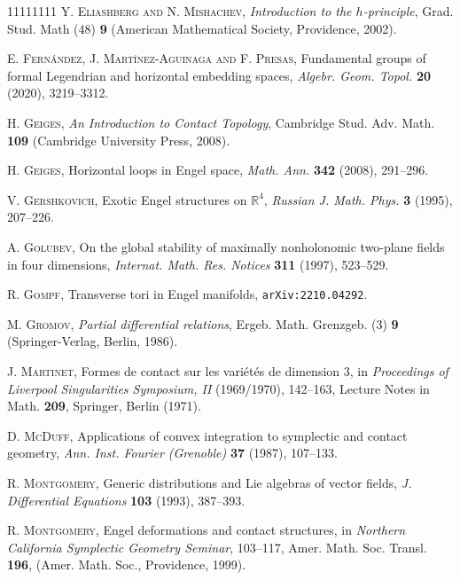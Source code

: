 \documentclass{amsart} %
\newcommand{\R}{\mathbb{R}}
\theoremstyle{thm}
\theoremstyle{definition}
\begin{document}
\begin{thebibliography} {11111111}
 \textsc{Y. Eliashberg and N. Mishachev}, \textit{Introduction to the $h$-principle}, Grad. Stud. Math (48) \textbf{9}  (American Mathematical Society, Providence, 2002).

 \textsc{E. Fern\'{a}ndez, J. Mart\'{i}nez-Aguinaga and F. Presas}, Fundamental groups of formal Legendrian and horizontal embedding spaces, \textit{Algebr. Geom. Topol.} \textbf{20} (2020), 3219--3312.

 \textsc{H. Geiges}, \textit{An Introduction to Contact Topology}, Cambridge Stud. Adv. Math. \textbf{109}  (Cambridge University Press, 2008).

 \textsc{H. Geiges}, Horizontal loops in Engel space, \textit{Math. Ann.} \textbf{342} (2008), 291--296.

 \textsc{V. Gershkovich}, Exotic Engel structures on $\R^4$, \textit{Russian J. Math. Phys.} \textbf{3} (1995), 207--226.

 \textsc{A. Golubev}, On the global stability of maximally nonholonomic two-plane fields in four dimensions, \textit{Internat. Math. Res. Notices} \textbf{311} (1997), 523--529.

 \textsc{R. Gompf}, Transverse tori in Engel manifolds, \texttt{arXiv:2210.04292}. 

 \textsc{M. Gromov}, \textit{Partial differential relations}, Ergeb. Math. Grenzgeb. (3) \textbf{9}  (Springer-Verlag, Berlin, 1986).


 \textsc{J. Martinet}, Formes de contact sur les vari\'et\'es de dimension $3$, in \textit{Proceedings of Liverpool Singularities Symposium, II} (1969/1970), 142--163, Lecture Notes in Math. \textbf{209}, Springer, Berlin (1971).

 \textsc{D. McDuff}, Applications of convex integration to symplectic and contact geometry, \textit{Ann. Inst. Fourier (Grenoble)} \textbf{37} (1987), 107--133.

 \textsc{R. Montgomery}, Generic distributions and Lie algebras of vector fields, \textit{J. Differential Equations} \textbf{103} (1993), 387--393.

 \textsc{R. Montgomery}, Engel deformations and contact structures, in \textit{Northern {C}alifornia {S}ymplectic {G}eometry {S}eminar}, 103--117, Amer. Math. Soc. Transl. \textbf{196}, (Amer. Math. Soc., Providence, 1999). 


\end{thebibliography}
\end{document}
